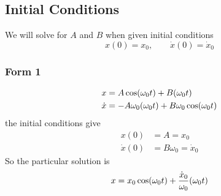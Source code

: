 \documentclass{article}
\let\sin\relax
\DeclareMathOperator{\sin}{\smash{\mathrm{sin}}}
\begin{document}
\subsection{Initial Conditions}
We will solve for $A$ and $B$ when given initial conditions
\begin{equation*}
    x(0) = x_0, \qquad \dot{x}(0) = \dot{x}_0
\end{equation*}
\subsubsection{Form 1}
\begin{align*}
    x &= A\cos(\omega_0t) + B\sin(\omega_0t) \\ 
    \dot{x} &= -A\omega_0\sin(\omega_0t) + B\omega_0\cos(\omega_0t) 
\end{align*}
the initial conditions give
\begin{align*}
    x(0) &= A = x_0\\ 
    \dot{x}(0) &=  B\omega_0 = \dot{x}_0
\end{align*}
So the particular solution is
\begin{equation*}
    x = x_0\cos(\omega_0t) + \frac{\dot{x}_0}{\omega_0}\sin(\omega_0t)
\end{equation*}
\end{document}
